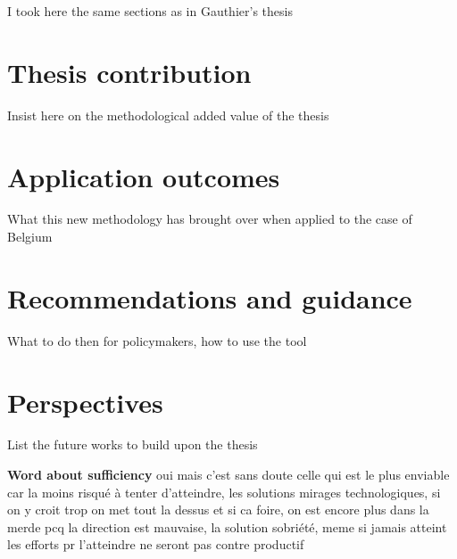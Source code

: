 I took here the same sections as in Gauthier's thesis
\section*{Thesis contribution}
Insist here on the methodological added value of the thesis

\section*{Application outcomes}
What this new methodology has brought over when applied to the case of Belgium

\section*{Recommendations and guidance}
What to do then for policymakers, how to use the tool

\section*{Perspectives}
List the future works to build upon the thesis

\textbf{Word about sufficiency} oui mais c'est sans doute celle qui est le plus enviable car la moins risqué à tenter d'atteindre, les solutions mirages technologiques, si on y croit trop on met tout la dessus et si ca foire, on est encore plus dans la merde pcq la direction est mauvaise, la solution sobriété, meme si jamais atteint les efforts pr l'atteindre ne seront pas contre productif